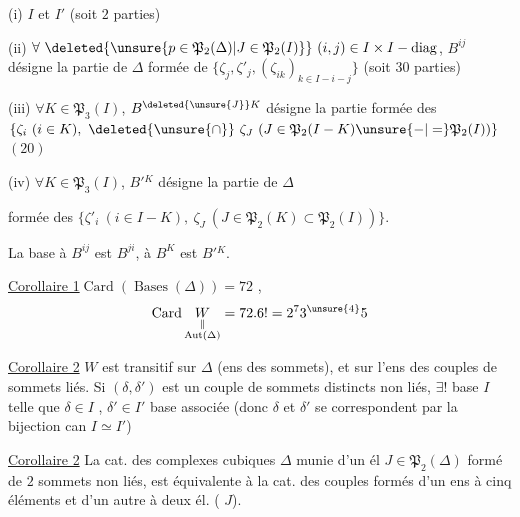 (i) $I$ et $I'$ \deleted{\unsure{:}} (soit $2$ parties)

(ii) $\forall\ \deleted{\unsure{p\in\mathfrak P_2(\Delta)|J\in\mathfrak P_2(I)}}\ (i,j)\in I\times I-\operatorname{diag}$, $B^{ij}$ désigne la partie de $\Delta$ formée de $\{\zeta_j,\zeta'_j,(\zeta_{ik})_{k\in I-i-j}\}$ (soit $30$ parties)

(iii) $\forall K\in\mathfrak P_3(I)$, $B^{\deleted{\unsure{J}}K}$ désigne la partie  formée des $\{\zeta_i\ (i\in K),\ \deleted{\unsure{\cap}}\ \zeta_J\ (J\in\mathfrak P_2(I-K)\unsure{-|=}\mathfrak P_2(I))\}$ $(20)$

(iv) $\forall K\in\mathfrak P_3(I)$, $B'{}^K$ désigne la partie de $\Delta$

formée des $\{\zeta'_i\ (i\in I-K),\ \zeta_J\ (J\in\mathfrak P_2(K)\subset\mathfrak P_2(I))\}$.

La base  à $B^{ij}$ est $B^{ji}$,   à $B^K$ est $B'{}^K$.

\uline{Corollaire 1}\quad $\operatorname{Card}(\operatorname{Bases}(\Delta))=72$ , 
\[
\operatorname{Card}\underset{\substack{\Vert\\\operatorname{Aut}(\Delta)}}{W}=72.6!=2^7 3^{\unsure{4}}5
\]

\uline{Corollaire 2} $W$ est transitif sur $\Delta$ (ens des sommets), et  sur l'ens des couples de sommets   liés. Si $(\delta,\delta')$ est un couple de sommets distincts non liés, $\exists!$ base $I$ telle que $\delta\in I$ , $\delta'\in I'$ base associée (donc $\delta$ et $\delta'$ se correspondent par la bijection can $I\simeq I'$)

\uline{Corollaire 2} La cat. des complexes cubiques $\Delta$ munie d'un él $J\in\mathfrak P_2(\Delta)$ formé de $2$ sommets non liés, est équivalente à la cat. des couples formés d'un ens à cinq éléments et d'un autre à deux él. ( $J$).




